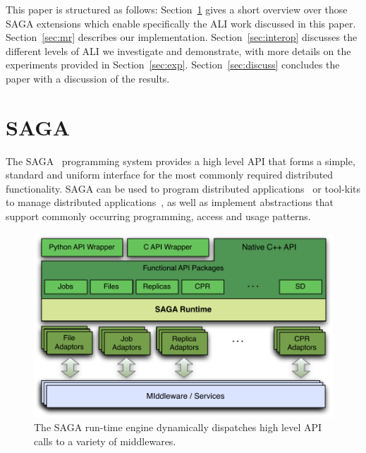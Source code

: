 \documentclass[3p,twocolumn]{elsarticle}
\begin{document}


This paper is structured as follows: Section~\ref{sec:saga} gives a
short overview over those SAGA extensions which enable specifically
the ALI work discussed in this paper.  Section~\ref{sec:mr} describes
our \smr implementation.  Section~\ref{sec:interop} discusses the
different levels of ALI we investigate and demonstrate, with more
details on the experiments provided in Section~\ref{sec:exp}.
Section~\ref{sec:discuss} concludes the paper with a discussion of the
results.




\section{SAGA}
\label{sec:saga}

The SAGA~\cite{saga-core, Kaiser:2006qp} programming system provides a
high level API that forms a simple, standard and uniform interface for
the most commonly required distributed functionality.  SAGA can be
used to program distributed applications~\cite{saga_escience07,
saga_tg08} or tool-kits to manage distributed
applications~\cite{Luckow:2008xy}, as well as implement abstractions
that support commonly occurring programming, access and usage
patterns.

\begin{figure}[t]
 \dnnn
 \includegraphics[scale=0.5]{figures/saga-figure02.pdf}
 \caption{The SAGA run-time engine dynamically dispatches high level
          API calls to a variety of middlewares.}
 \label{fig:saga}
\end{figure}
\end{document}
